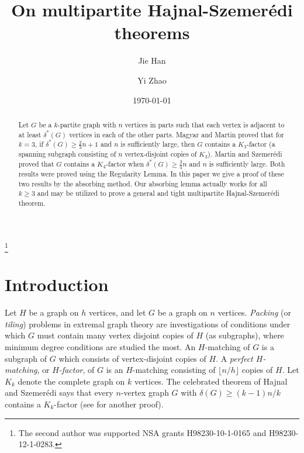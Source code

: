 \documentclass[reqno]{amsart}
\theoremstyle{plain}
\begin{document}
\title{On multipartite Hajnal-Szemer\'edi theorems}
\thanks{The second author was supported NSA grants H98230-10-1-0165 and H98230-12-1-0283.}
\author{Jie Han}
\address[Jie Han and Yi Zhao]
{Department of Mathematics and Statistics,\newline
\indent Georgia State University, Atlanta, GA 30303}
\author{Yi Zhao}
%
\date{\today}
%
\begin{abstract}
Let $G$ be a $k$-partite graph with $n$ vertices in parts such that each vertex is
adjacent to at least $\delta^*(G)$ vertices in each of the other parts. Magyar and Martin \cite{MaMa}
proved that for $k=3$, if $\delta^*(G)\ge \frac{2}{3}n +1$ and $n$ is sufficiently
large, then $G$ contains a $K_3$-factor (a spanning subgraph consisting of $n$ vertex-disjoint copies
of $K_3$). Martin and Szemer\'edi \cite{MaSz} proved that $G$ contains a $K_4$-factor when $\delta^*(G)\ge \frac{3}{4}n$ and $n$ is sufficiently large. Both results were proved using the Regularity Lemma.
In this paper we give a proof of these two results by the absorbing method. Our absorbing lemma actually works for all $k\ge 3$ and may be utilized to prove a general and tight multipartite Hajnal-Szemer\'edi theorem.
\end{abstract}

\maketitle





\section{Introduction}

Let $H$ be a graph on $h$  vertices, and let $G$ be a graph on $n$
vertices.  \emph{Packing} (or \emph{tiling}) problems in extremal
graph theory are investigations of conditions under which $G$ must
contain many vertex disjoint copies of $H$ (as subgraphs), where
minimum degree conditions are studied the most. An $H$-matching of $G$
is a subgraph of $G$ which consists of vertex-disjoint copies of
$H$. A {\em perfect $H$-matching}, or {\em $H$-factor}, of $G$ is an
$H$-matching consisting of $\lfloor n/h\rfloor$ copies of $H$.  Let $K_k$ denote the
complete graph on $k$ vertices. The celebrated theorem
of Hajnal and Szemer\'edi \cite{HaSz} says that every $n$-vertex graph $G$  with $\delta(G)\ge ( k-1 )n /k$ contains a $K_k$-factor  (see \cite{KK} for another proof).
\end{document}
